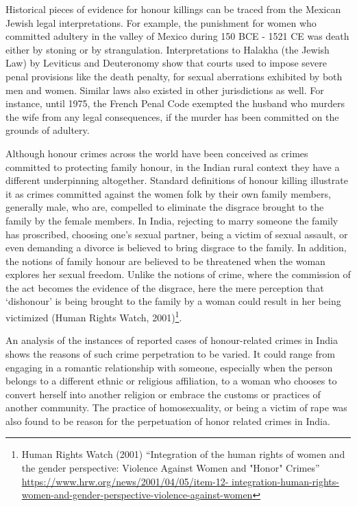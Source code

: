 \begin{multicols}{2}
\noi
Historical pieces of evidence for honour killings can be traced from the Mexican Jewish
legal interpretations. For example, the punishment for women who committed adultery
in the valley of Mexico during 150 BCE - 1521 CE was death either by stoning or by
strangulation. Interpretations to Halakha (the Jewish Law) by Leviticus and
Deuteronomy show that courts used to impose severe penal provisions like the death
penalty, for sexual aberrations exhibited by both men and women. Similar laws also
existed in other jurisdictions as well. For instance, until 1975, the French Penal Code
exempted the husband who murders the wife from any legal consequences, if the
murder has been committed on the grounds of adultery. 



\noi
Although honour crimes across the world have been conceived as crimes committed to
protecting family honour, in the Indian rural context they have a different underpinning
altogether. Standard definitions of honour killing illustrate it as crimes committed
against the women folk by their own family members, generally male, who are,
compelled to eliminate the disgrace brought to the family by the female members. In
India, rejecting to marry someone the family has proscribed, choosing one’s sexual
partner, being a victim of sexual assault, or even demanding a divorce is believed to
bring disgrace to the family. In addition, the notions of family honour are believed to
be threatened when the woman explores her sexual freedom. Unlike the notions of
crime, where the commission of the act becomes the evidence of the disgrace, here the
mere perception that ‘dishonour’ is being brought to the family by a woman could result
in her being victimized (Human Rights Watch, 2001)\footnote{ Human Rights Watch (2001) “Integration of the human rights of women and the gender perspective:
Violence Against Women and "Honor" Crimes” \url{https://www.hrw.org/news/2001/04/05/item-12-
integration-human-rights-women-and-gender-perspective-violence-against-women}}.

\noi
An analysis of the instances of reported cases of honour-related crimes in India shows
the reasons of such crime perpetration to be varied. It could range from engaging in a
romantic relationship with someone, especially when the person belongs to a different
ethnic or religious affiliation, to a woman who chooses to convert herself into another
religion or embrace the customs or practices of another community. The practice of homosexuality, or being a victim of rape was also found to be reason for the
perpetuation of honor related crimes in India.


\end{multicols}
